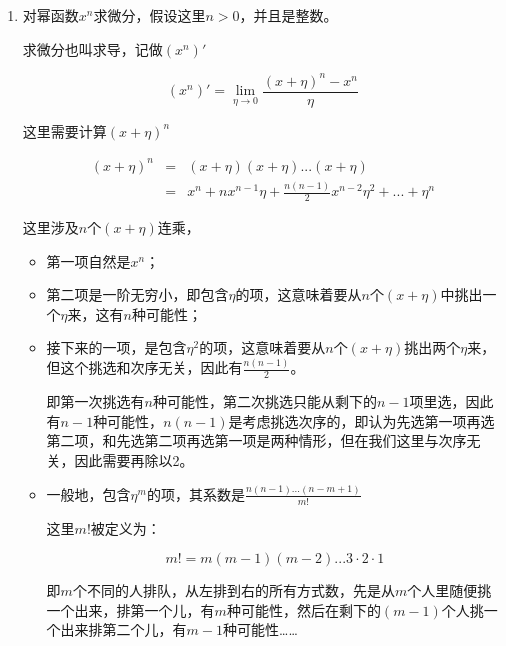\begin{enumerate}
\item 

对幂函数$x^n$求微分，假设这里$n > 0$，并且是整数。

求微分也叫求导，记做$(x^n)'$

\begin{equation}
( x^n )' = \lim\limits_{\eta \to 0} \frac{(x+ \eta)^n - x^n}{\eta}
\end{equation}

这里需要计算$(x + \eta)^n$

\begin{eqnarray*}
( x + \eta)^n & = & (x + \eta)(x + \eta) ... (x + \eta)   \\
{} & = & x^n + n x^{n-1} \eta + \frac{n(n-1)}{2} x^{n-2} \eta^2 + ... + \eta^n
\end{eqnarray*}

这里涉及$n$个$( x + \eta)$连乘，

\begin{itemize}
\item 

第一项自然是$x^n$；

\item

第二项是一阶无穷小，即包含$\eta$的项，这意味着要从$n$个$( x + \eta)$中挑出一个$\eta$来，这有$n$种可能性；

\item

接下来的一项，是包含$\eta^2$的项，这意味着要从$n$个$( x + \eta)$挑出两个$\eta$来，但这个挑选和次序无关，因此有$\frac{n (n -1)}{2}$。

即第一次挑选有$n$种可能性，第二次挑选只能从剩下的$n-1$项里选，因此有$n-1$种可能性，$n(n-1)$是考虑挑选次序的，即认为先选第一项再选第二项，和先选第二项再选第一项是两种情形，但在我们这里与次序无关，因此需要再除以2。

\item

一般地，包含$\eta^m$的项，其系数是$\frac{n(n-1)...(n-m+1)}{m!}$

这里$m!$被定义为：

\begin{equation}
m! = m (m-1) (m-2) ... 3 \cdot 2 \cdot 1
\end{equation}

即$m$个不同的人排队，从左排到右的所有方式数，先是从$m$个人里随便挑一个出来，排第一个儿，有$m$种可能性，然后在剩下的$(m-1)$个人挑一个出来排第二个儿，有$m-1$种可能性……



\end{itemize}
\end{enumerate}
